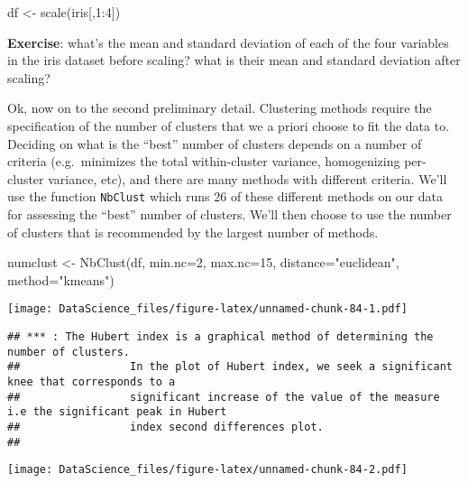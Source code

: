 \documentclass[
]{book}
\newenvironment{Shaded}{\begin{snugshade}}{\end{snugshade}}
\newcommand{\AttributeTok}[1]{\textcolor[rgb]{0.77,0.63,0.00}{#1}}
\newcommand{\DecValTok}[1]{\textcolor[rgb]{0.00,0.00,0.81}{#1}}
\newcommand{\FunctionTok}[1]{\textcolor[rgb]{0.00,0.00,0.00}{#1}}
\newcommand{\NormalTok}[1]{#1}
\newcommand{\OtherTok}[1]{\textcolor[rgb]{0.56,0.35,0.01}{#1}}
\newcommand{\SpecialCharTok}[1]{\textcolor[rgb]{0.00,0.00,0.00}{#1}}
\newcommand{\StringTok}[1]{\textcolor[rgb]{0.31,0.60,0.02}{#1}}
\begin{document}
\begin{Shaded}
\begin{Highlighting}[]
\NormalTok{df }\OtherTok{\textless{}{-}} \FunctionTok{scale}\NormalTok{(iris[,}\DecValTok{1}\SpecialCharTok{:}\DecValTok{4}\NormalTok{])}
\end{Highlighting}
\end{Shaded}

\textbf{Exercise}: what's the mean and standard deviation of each of the four variables in the iris dataset before scaling? what is their mean and standard deviation after scaling?

Ok, now on to the second preliminary detail. Clustering methods require the specification of the number of clusters that we a priori choose to fit the data to. Deciding on what is the ``best'' number of clusters depends on a number of criteria (e.g.~minimizes the total within-cluster variance, homogenizing per-cluster variance, etc), and there are many methods with different criteria. We'll use the function \texttt{NbClust} which runs 26 of these different methods on our data for assessing the ``best'' number of clusters. We'll then choose to use the number of clusters that is recommended by the largest number of methods.

\begin{Shaded}
\begin{Highlighting}[]
\NormalTok{numclust }\OtherTok{\textless{}{-}} \FunctionTok{NbClust}\NormalTok{(df, }\AttributeTok{min.nc=}\DecValTok{2}\NormalTok{, }\AttributeTok{max.nc=}\DecValTok{15}\NormalTok{, }\AttributeTok{distance=}\StringTok{"euclidean"}\NormalTok{, }\AttributeTok{method=}\StringTok{"kmeans"}\NormalTok{)}
\end{Highlighting}
\end{Shaded}

\texttt{[image: DataScience\_files/figure-latex/unnamed-chunk-84-1.pdf]}

\begin{verbatim}
## *** : The Hubert index is a graphical method of determining the number of clusters.
##                 In the plot of Hubert index, we seek a significant knee that corresponds to a 
##                 significant increase of the value of the measure i.e the significant peak in Hubert
##                 index second differences plot. 
## 
\end{verbatim}

\texttt{[image: DataScience\_files/figure-latex/unnamed-chunk-84-2.pdf]}
\end{document}
